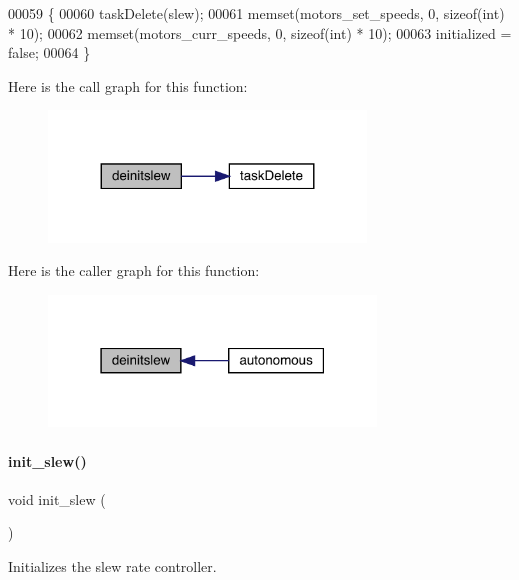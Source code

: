 \begin{DoxyCode}
00059                   \{
00060   taskDelete(slew);
00061   memset(motors_set_speeds, 0, \textcolor{keyword}{sizeof}(\textcolor{keywordtype}{int}) * 10);
00062   memset(motors_curr_speeds, 0, \textcolor{keyword}{sizeof}(\textcolor{keywordtype}{int}) * 10);
00063   initialized = \textcolor{keyword}{false};
00064 \}
\end{DoxyCode}
Here is the call graph for this function\+:
\nopagebreak
\begin{figure}[H]
\begin{center}
\leavevmode
\includegraphics[width=239pt]{slew_8h_a981c9990a969d2587e66e550737f7cd9_cgraph}
\end{center}
\end{figure}
Here is the caller graph for this function\+:
\nopagebreak
\begin{figure}[H]
\begin{center}
\leavevmode
\includegraphics[width=247pt]{slew_8h_a981c9990a969d2587e66e550737f7cd9_icgraph}
\end{center}
\end{figure}
\mbox{\label{slew_8h_a321758941d88b75783955c819bb75005}} 
\paragraph{init\+\_\+slew()}
{\footnotesize\ttfamily void init\+\_\+slew (\begin{DoxyParamCaption}{ }\end{DoxyParamCaption})}



Initializes the slew rate controller. 

